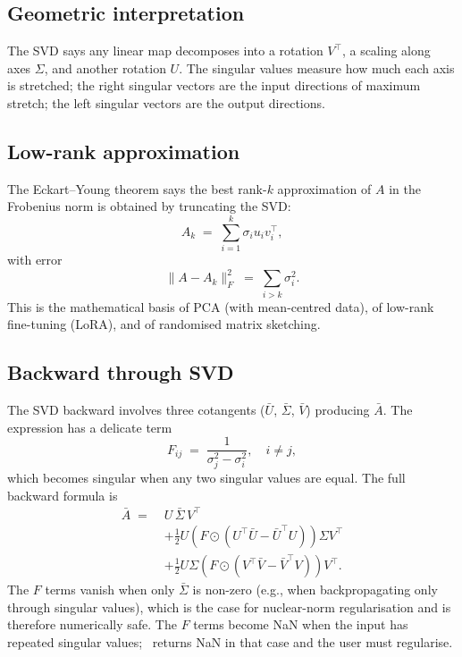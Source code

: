 \subsection{Geometric interpretation}
\label{ssec:linalg:svd_geom}

The SVD says any linear map decomposes into a rotation $V^\top$,
a scaling along axes $\Sigma$, and another rotation $U$. The
singular values measure how much each axis is stretched; the
right singular vectors are the input directions of maximum
stretch; the left singular vectors are the output directions.

\subsection{Low-rank approximation}
\label{ssec:linalg:low_rank}

The Eckart--Young theorem \cite{eckart_young_1936} says the best
rank-$k$ approximation of $A$ in the Frobenius norm is obtained
by truncating the SVD:
\[
A_k \;=\; \sum_{i=1}^{k} \sigma_i u_i v_i^\top,
\]
with error
\[
\|A - A_k\|_F^2 \;=\; \sum_{i > k} \sigma_i^2.
\]
This is the mathematical basis of PCA (with mean-centred data),
of low-rank fine-tuning (LoRA), and of randomised matrix sketching.

\subsection{Backward through SVD}
\label{ssec:linalg:svd_backward}

The SVD backward involves three cotangents ($\bar U$, $\bar
\Sigma$, $\bar V$) producing $\bar A$. The expression has a
delicate term
\[
F_{ij} \;=\; \frac{1}{\sigma_j^2 - \sigma_i^2}, \quad i \neq j,
\]
which becomes singular when any two singular values are equal.
The full backward formula is
\begin{align*}
\bar A \;=\;
&U\,\bar\Sigma\, V^\top \\[2pt]
&+ \tfrac{1}{2} U (F \odot (U^\top \bar U - \bar U^\top U)) \Sigma V^\top \\
&+ \tfrac{1}{2} U \Sigma (F \odot (V^\top \bar V - \bar V^\top V)) V^\top.
\end{align*}
The $F$ terms vanish when only $\bar \Sigma$ is non-zero (e.g.,
when backpropagating only through singular values), which is the
case for nuclear-norm regularisation and is therefore numerically
safe. The $F$ terms become NaN when the input has repeated
singular values; \Lucid\ returns NaN in that case and the user
must regularise.

